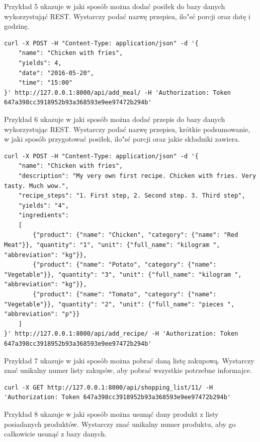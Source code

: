 \documentclass{article}
\begin{document}
Przykład 5 ukazuje w jaki sposób można dodać posiłek do bazy danych wykorzystująć REST. Wystarczy podać nazwę przepisu, ilo"sć porcji oraz datę i godzinę.

\begin{lstlisting}[label=recipe_api,caption=Dodawanie posiłku,breaklines=true]
curl -X POST -H "Content-Type: application/json" -d '{
    "name": "Chicken with fries",
    "yields": 4,
    "date": "2016-05-20",
    "time": "15:00"
}' http://127.0.0.1:8000/api/add_meal/ -H 'Authorization: Token 647a398cc3918952b93a368593e9ee97472b294b'
\end{lstlisting}

Przykład 6 ukazuje w jaki sposób można dodać przepis do bazy danych wykorzystując REST. Wystarczy podać nazwę przepisu, krótkie podsumowanie, w jaki sposób przygotować posiłek, ilo"sć porcji oraz jakie składniki zawiera. 

\begin{lstlisting}[label=recipe_api,caption=Dodawanie przepisu,breaklines=true]
curl -X POST -H "Content-Type: application/json" -d '{
    "name": "Chicken with fries",
    "description": "My very own first recipe. Chicken with fries. Very tasty. Much wow.",
    "recipe_steps": "1. First step, 2. Second step. 3. Third step",
    "yields": "4",
    "ingredients": 
    [
        {"product": {"name": "Chicken", "category": {"name": "Red Meat"}}, "quantity": "1", "unit": {"full_name": "kilogram ", "abbreviation": "kg"}},
        {"product": {"name": "Potato", "category": {"name": "Vegetable"}}, "quantity": "3", "unit": {"full_name": "kilogram ", "abbreviation": "kg"}},
        {"product": {"name": "Tomato", "category": {"name": "Vegetable"}}, "quantity": "2", "unit": {"full_name": "pieces ", "abbreviation": "p"}}
    ]
}' http://127.0.0.1:8000/api/add_recipe/ -H 'Authorization: Token 647a398cc3918952b93a368593e9ee97472b294b'
\end{lstlisting}

Przykład 7 ukazuje w jaki sposób można pobrać daną listę zakupową. Wystarczy znać unikalny numer listy zakupów, aby pobrać wszystkie potrzebne informajce.

\begin{lstlisting}[label=shoppinglist_api,caption=Pobieranie listy zakupów,breaklines=true]
curl -X GET http://127.0.0.1:8000/api/shopping_list/11/ -H 'Authorization: Token 647a398cc3918952b93a368593e9ee97472b294b'
\end{lstlisting}

Przykład 8 ukazuje w jaki sposób można usunąć dany produkt z listy posiadanych produktów. Wystarczy znać unikalny numer produktu, aby go całkowicie usunąć z bazy danych.
\end{document}
